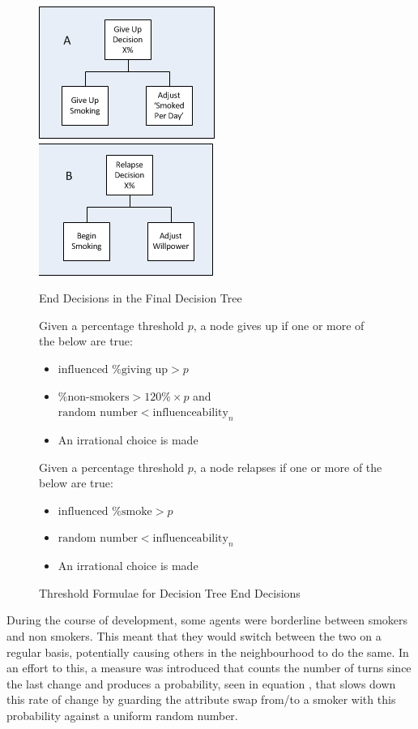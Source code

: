 \documentclass[]{report}
\begin{document}
\begin{figure}
\label{img:end-dec}
\begin{center}
\includegraphics[scale=1]{End-DecB.png}
\includegraphics[scale=1]{End-DecA.png}
\end{center}
\caption{End Decisions in the Final Decision Tree}
\end{figure}

\begin{figure}
\label{eq:end-thresh}
Given a percentage threshold $p$, a node gives up if one or more of the below are true:
\begin{itemize}
\item $\text{influenced \% giving up} > p$
\item $\text{\% non-smokers} > 120\% \times p$ and $\text{random number} < \text{influenceability}_{n}$
\item An irrational choice is made
\end{itemize}

Given a percentage threshold $p$, a node relapses if one or more of the below are true:
\begin{itemize}
\item $\text{influenced \% smoke} > p$
\item $\text{random number} < \text{influenceability}_{n}$
\item An irrational choice is made
\end{itemize}
\caption{Threshold Formulae for Decision Tree End Decisions}
\end{figure}

During the course of development, some agents were borderline between smokers and non smokers. This meant that they would switch between the two on a regular basis, potentially causing others in the neighbourhood to do the same. In an effort to this, a measure was introduced that counts the number of turns since the last change and produces a probability, seen in equation \label{eq:turns}, that slows down this rate of change by guarding the attribute swap from/to a smoker with this probability against a uniform random number.
\end{document}
